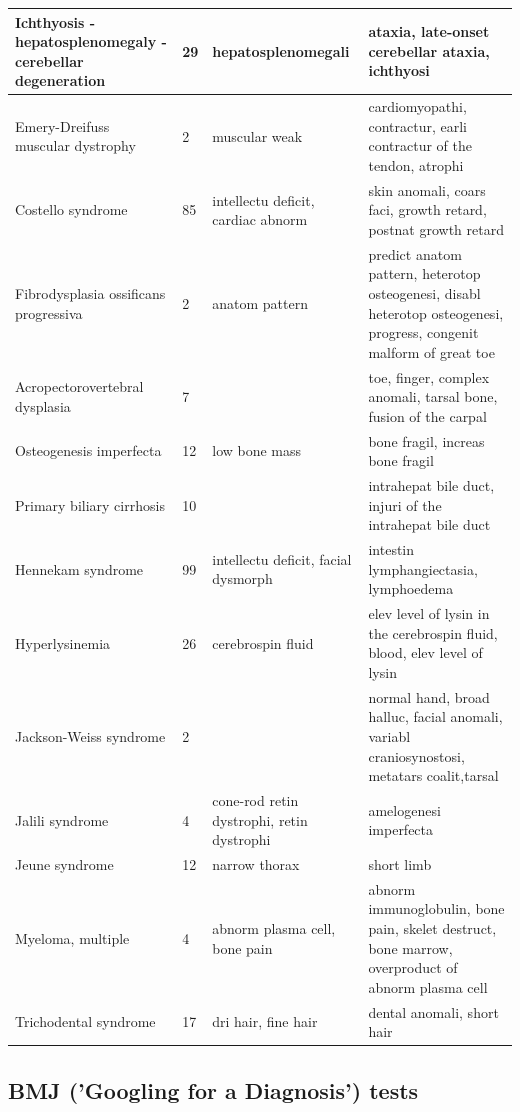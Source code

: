\documentclass[10pt,letterpaper,final]{article}
\begin{document}
\begin{center}
\begin{small}
\begin{longtable}{|p{3.5cm}|p{1.5cm}|p{3cm}|p{3cm}|}
Ichthyosis - hepatosplenomegaly - cerebellar degeneration & 29 & hepatosplenomegali & ataxia, late-onset cerebellar ataxia, ichthyosi \\ \hline
Emery-Dreifuss muscular dystrophy & 2 & muscular weak &  cardiomyopathi, contractur, earli contractur of the tendon, atrophi \\ \hline
Costello syndrome & 85 & intellectu deficit, cardiac abnorm &  skin anomali, coars faci, growth retard, postnat growth retard \\ \hline
Fibrodysplasia ossificans progressiva & 2 & anatom pattern  & predict anatom pattern, heterotop osteogenesi, disabl heterotop osteogenesi, progress, congenit malform of great toe  \\ \hline
Acropectorovertebral dysplasia & 7 &  & toe, finger, complex anomali, tarsal bone, fusion of the carpal \\ \hline
Osteogenesis imperfecta & 12 & low bone mass & bone fragil, increas bone fragil \\ \hline
Primary biliary cirrhosis & 10  &  & intrahepat bile duct, injuri of the intrahepat bile duct \\ \hline
Hennekam syndrome & 99 & intellectu deficit, facial dysmorph & intestin lymphangiectasia, lymphoedema \\ \hline
Hyperlysinemia & 26  & cerebrospin fluid & elev level of lysin in the cerebrospin fluid, blood, elev level of lysin \\ \hline
Jackson-Weiss syndrome & 2 &  & normal hand, broad halluc, facial anomali, variabl craniosynostosi, metatars coalit,tarsal \\ \hline
Jalili syndrome & 4 & cone-rod retin dystrophi, retin dystrophi  & amelogenesi imperfecta \\ \hline
Jeune syndrome & 12 & narrow thorax &  short limb \\ \hline
Myeloma, multiple & 4 & abnorm plasma cell, bone pain & abnorm immunoglobulin, bone pain, skelet destruct, bone marrow, overproduct of abnorm plasma cell \\ \hline
Trichodental syndrome & 17 & dri hair, fine hair & dental anomali, short hair  \\ \hline
	\end{longtable}
\end{small}
\end{center}

\subsection{BMJ ('Googling for a Diagnosis') tests }
\end{document}

